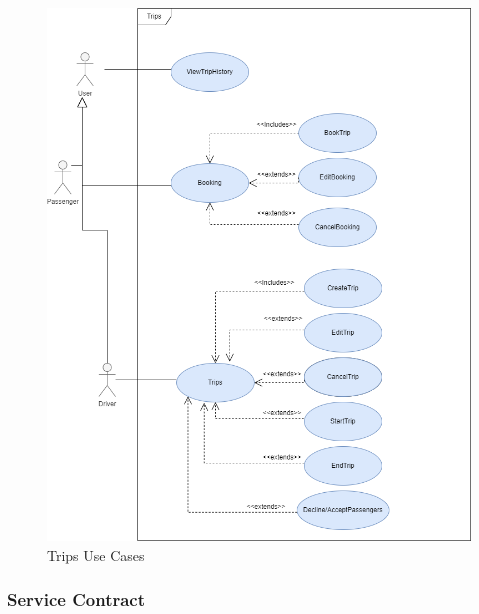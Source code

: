 \documentclass[hidelinks, 12pt, a4paper]{article}
\begin{document}
\begin{figure}[H]

      \centering
      \includegraphics[width = 15cm]{images/Trips Usecase.drawio.png}
      \caption{Trips Use Cases}
      \label{fig:User UseCases}

\end{figure}
\newpage
\subsubsection{Service Contract}
\end{document}
